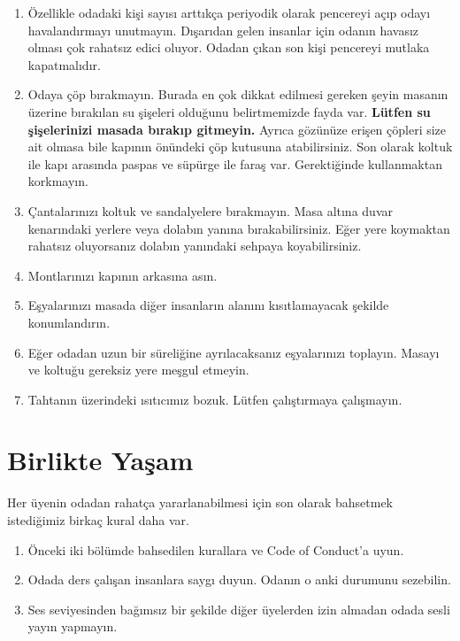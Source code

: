 \documentclass{article}
\begin{document}
\begin{enumerate}
	\item Özellikle odadaki kişi sayısı arttıkça periyodik olarak pencereyi
		açıp odayı havalandırmayı unutmayın. Dışarıdan gelen insanlar
		için odanın havasız olması çok rahatsız edici oluyor. Odadan
		çıkan son kişi pencereyi mutlaka kapatmalıdır.
	\item Odaya çöp bırakmayın. Burada en çok dikkat edilmesi gereken şeyin
		masanın üzerine bırakılan su şişeleri olduğunu belirtmemizde
		fayda var. \textbf{Lütfen su şişelerinizi masada bırakıp
		gitmeyin.} Ayrıca gözünüze erişen çöpleri size ait olmasa bile
		kapının önündeki çöp kutusuna atabilirsiniz. Son olarak koltuk
		ile kapı arasında paspas ve süpürge ile faraş var. Gerektiğinde
		kullanmaktan korkmayın.
	\item Çantalarınızı koltuk ve sandalyelere bırakmayın. Masa altına
		duvar kenarındaki yerlere veya dolabın yanına bırakabilirsiniz.
		Eğer yere koymaktan rahatsız oluyorsanız dolabın yanındaki
		sehpaya koyabilirsiniz.
	\item Montlarınızı kapının arkasına asın.
	\item Eşyalarınızı masada diğer insanların alanını kısıtlamayacak
		şekilde konumlandırın.
	\item Eğer odadan uzun bir süreliğine ayrılacaksanız eşyalarınızı
		toplayın. Masayı ve koltuğu gereksiz yere meşgul etmeyin.
	\item Tahtanın üzerindeki ısıtıcımız bozuk. Lütfen çalıştırmaya
		çalışmayın.
\end{enumerate}

\section{Birlikte Yaşam}
Her üyenin odadan rahatça yararlanabilmesi için son olarak bahsetmek
istediğimiz birkaç kural daha var.
\begin{enumerate}
	\item Önceki iki bölümde bahsedilen kurallara ve Code of Conduct'a
		uyun.
	\item Odada ders çalışan insanlara saygı duyun. Odanın o anki durumunu
		sezebilin.
	\item Ses seviyesinden bağımsız bir şekilde diğer üyelerden izin
		almadan odada sesli yayın yapmayın.
\end{enumerate}
	
\end{document}
